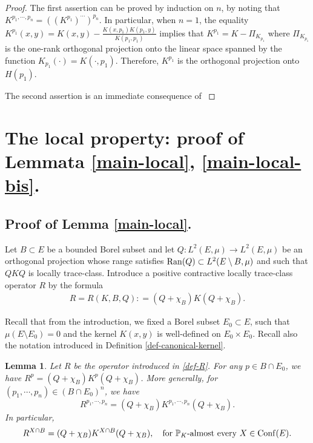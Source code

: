 \documentclass[12pt]{paper}
\newtheorem{lemma}[theorem]{Lemma}
\numberwithin{theorem}{section}
\numberwithin{figure}{section}
\numberwithin{equation}{section}
\begin{document}
\begin{proof}
The first assertion can be proved by induction on $n$, by noting that $ K^{p_1, \cdots, p_n} = ((K^{p_1})^{\cdots})^{p_n}$.  In particular, when $n = 1$, the equality $K^{p_1}(x, y) = K (x, y)  -\frac{K(x, p_1) K(p_1, y)}{ K(p_1, p_1)}$ implies that $K^{p_1} = K - \Pi_{K_{p_1}}$ where $\Pi_{K_{p_1}}$ is the one-rank orthogonal projection onto the linear space spanned by the function $K_{p_1}(\cdot) = K(\cdot, p_1)$. Therefore, $K^{p_1}$ is the orthogonal projection onto $H(p_1)$.

 The second assertion is an immediate consequence of \cite[Proposition 2.5]{BQS}
\end{proof}

\section{The local property: proof of Lemmata \ref{main-local}, \ref{main-local-bis}.}

\subsection{Proof of Lemma \ref{main-local}.}

Let $B\subset E$ be a  bounded Borel subset and  let  $Q: L^2(E, \mu) \rightarrow L^2(E,\mu)$ be  an orthogonal projection whose range satisfies $\mathrm{Ran}(Q) \subset L^2(E\setminus B, \mu)$ and such that $QKQ$ is
locally trace-class.  Introduce a positive contractive locally trace-class operator $R$ by the formula
\begin{align}\label{def-R}
R = R(K, B, Q) : =(Q+\chi_B)K(Q+\chi_B).
\end{align}




Recall that from the introduction, we fixed a Borel subset $E_0 \subset E$, such that  $\mu(E \setminus E_0) =0$ and the kernel $K(x, y)$ is well-defined on $E_0\times E_0$.  Recall also the notation introduced in Definition \ref{def-canonical-kernel}.
 \begin{lemma}\label{lem-palm}
Let $R$ be the operator introduced in \eqref{def-R}.  For any $p\in B \cap E_0$, we have $R^p= (Q+\chi_B)  K^p  (Q+\chi_B)$.
More generally, for  $(p_1, \cdots, p_n)\in (B\cap E_0)^n$, we have
\[
R^{p_1, \cdots, p_n}= (Q+\chi_B)  K^{p_1, \cdots, p_n}  (Q+\chi_B) .
\]
In particular,
\[
R^{X\cap B} = (Q + \chi_B) K^{X\cap B} (Q +\chi_B),\quad \text{for $\mathbb{P}_K$-almost every $X\in \mathrm{Conf}(E)$.}
\]
\end{lemma}
\end{document}
